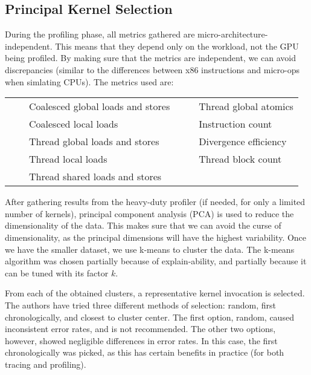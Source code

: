 \subsection{Principal Kernel Selection}\label{subsec:pks}
During the profiling phase, all metrics gathered are micro-architecture-independent.
This means that they depend only on the workload, not the GPU being profiled.
By making sure that the metrics are independent, we can avoid discrepancies (similar to the differences between x86 instructions and micro-ops when simlating CPUs).
The metrics used are:

\vspace{5mm}

\newcommand{\tabitem}{~~\textbullet~~}
\begin{tabular}{p{}p{}}
    \tabitem Coalesced global loads and stores & \tabitem Thread global atomics \\
    \tabitem Coalesced local loads             & \tabitem Instruction count     \\
    \tabitem Thread global loads and stores    & \tabitem Divergence efficiency \\
    \tabitem Thread local loads                & \tabitem Thread block count    \\
    \tabitem Thread shared loads and stores
\end{tabular}

\vspace{5mm}

After gathering results from the heavy-duty profiler (if needed, for only a limited number of kernels), principal component analysis (PCA) is used to reduce the dimensionality of the data.
This makes sure that we can avoid the curse of dimensionality, as the principal dimensions will have the highest variability.
Once we have the smaller dataset, we use k-means to cluster the data.
The k-means algorithm was chosen partially because of explain-ability, and partially because it can be tuned with its factor $k$.

From each of the obtained clusters, a representative kernel invocation is selected.
The authors have tried three different methods of selection: random, first chronologically, and closest to cluster center.
The first option, random, caused inconsistent error rates, and is not recommended.
The other two options, however, showed negligible differences in error rates.
In this case, the first chronologically was picked, as this has certain benefits in practice (for both tracing and profiling).

